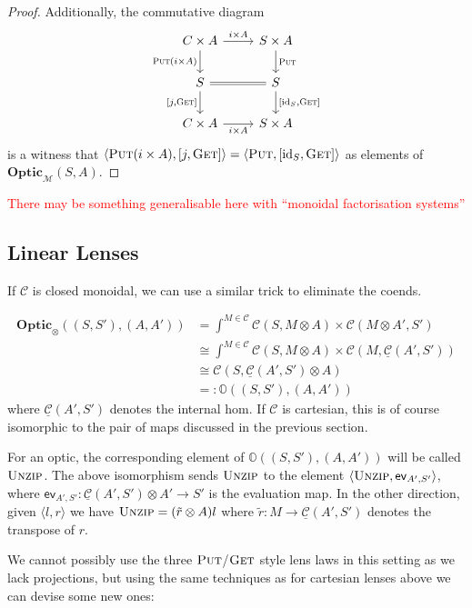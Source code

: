 \documentclass[11pt,a4paper]{article}
\theoremstyle{plain}
\theoremstyle{definition}
\newcommand{\C}{\mathscr{C}}
\newcommand{\homC}{\underline{\C}}
\newcommand{\M}{\mathscr{M}}
\newcommand{\Optic}{\mathbf{Optic}}
\newcommand{\id}{\mathrm{id}}
\newcommand{\fget}{\textsc{Get}}
\newcommand{\fput}{\textsc{Put}}
\newcommand{\funzip}{\textsc{Unzip}}
\newcommand{\todo}[1]{\textcolor{red}{\small #1}}
\begin{document}
\begin{proof}
  Additionally, the commutative diagram
  \[
    \begin{tikzcd}
      C \times A \ar[r, "i \times A"] \ar[d, "\fput (i \times A)", swap] & S \times A \ar[d, "\fput"] \\
      S \ar[r, equal] \ar[d, "{[j,\fget]}", swap] & S \ar[d, "{[\id_S, \fget]}"]  \\
      C \times A \ar[r, "i \times A", swap] & S \times A
    \end{tikzcd}
  \]
  is a witness that $\langle \fput (i \times A), [j,\fget] \rangle = \langle \fput, [\id_S, \fget] \rangle$ as elements of $\Optic_\M(S, A)$.
\end{proof}

\todo{There may be something generalisable here with ``monoidal factorisation systems''}

\subsection{Linear Lenses}
\newcommand{\ev}{\mathsf{ev}}
\newcommand{\coev}{\mathsf{coev}}

If $\C$ is closed monoidal, we can use a similar trick to eliminate the coends.

\begin{align*}
  \Optic_\otimes((S, S'), (A, A')) &= \int^{M \in \C} \C(S, M \otimes A) \times \C(M \otimes A', S') \\
                                   &\cong \int^{M \in \C} \C(S, M \otimes A) \times \C(M, \homC(A',S')) \\
                                   &\cong \C(S, \homC(A',S') \otimes A) \\
                                   &=: \mathbb{O}((S, S'), (A, A'))
\end{align*}
where $\homC(A', S')$ denotes the internal hom. If $\C$ is cartesian, this is of course isomorphic to the pair of maps discussed in the previous section.

For an optic, the corresponding element of $\mathbb{O}((S, S'), (A, A'))$ will be called $\funzip$. The above isomorphism sends $\funzip$ to the element $\langle \funzip , \ev_{A', S'} \rangle$, where $\ev_{A', S'} : \homC(A',S') \otimes A' \to S'$ is the evaluation map. In the other direction, given $\langle l, r \rangle$ we have $\funzip = (\tilde r \otimes A)l$ where $\tilde r : M \to \homC(A', S')$ denotes the transpose of $r$.

We cannot possibly use the three $\fput$/$\fget$ style lens laws in this setting as we lack projections, but using the same techniques as for cartesian lenses above we can devise some new ones:
\end{document}
